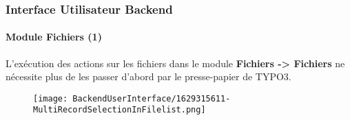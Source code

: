 %

\begin{frame}[fragile]
	\frametitle{Interface Utilisateur Backend}
	\framesubtitle{Module Fichiers (1)}

	L'exécution des actions sur les fichiers dans le module \textbf{Fichiers -> Fichiers}
	ne nécessite plus de les passer d'abord par le presse-papier de TYPO3.

	\begin{figure}
		\texttt{[image: BackendUserInterface/1629315611-MultiRecordSelectionInFilelist.png]}
	\end{figure}

\end{frame}

